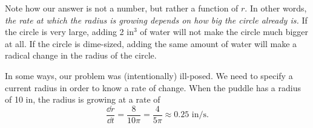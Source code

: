 \begin{example}
\begin{enumerate}
Note how our answer is not a number, but rather a function of $r$. In other words, \emph{the rate at which the radius is growing depends on how big the circle already is.} If the circle is very large, adding 2 in$^3$ of water will not make the circle much bigger at all. If the circle is dime-sized, adding the same amount of water will make a radical change in the radius of the circle.

In some ways, our problem was (intentionally) ill-posed. We need to specify a current radius in order to know a rate of change. When the puddle has a radius of 10 in, the radius is growing at a rate of
\[
\frac{\dd r}{\dd t} = \frac{8}{10\pi} = \frac{4}{5\pi} \approx 0.25\text{ in/s}.
\]
\end{enumerate}
\end{example}

